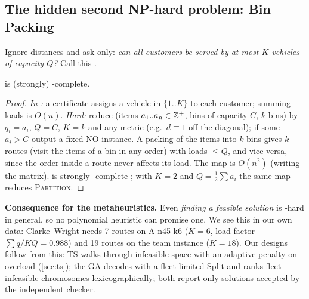 \subsection{The hidden second NP-hard problem: Bin Packing}
Ignore distances and ask only: \emph{can all customers be served by at most $K$ vehicles of capacity
$Q$?} Call this \feas.
\begin{theorem}\label{thm:bp}
\feas{} is (strongly) \NP-complete.
\end{theorem}
\begin{proof}
\emph{In \NP:} a certificate assigns a vehicle in $\{1..K\}$ to each customer; summing loads is $O(n)$.
\emph{Hard:} reduce \bp{} (items $a_1..a_n\in\mathbb{Z}^+$, bins of capacity $C$, $k$ bins) by
$q_i=a_i$, $Q=C$, $K=k$ and any metric (e.g.\ $d\equiv1$ off the diagonal); if some $a_i>C$ output a fixed
NO instance. A packing of the items into $k$ bins gives $k$ routes (visit the items of a bin in any order)
with loads $\le Q$, and vice versa, since the order inside a route never affects its load. The map is
$O(n^2)$ (writing the matrix). \bp{} is strongly \NP-complete \citep[SR1]{garey1979computers}; with
$K=2$ and $Q=\tfrac12\sum a_i$ the same map reduces \textsc{Partition}.
\end{proof}
\begin{keybox}
\textbf{Consequence for the metaheuristics.} Even \emph{finding a feasible solution} is \NP-hard in
general, so no polynomial heuristic can promise one. We see this in our own data: Clarke--Wright
needs 7 routes on A-n45-k6 ($K=6$, load factor $\sum q/KQ=0.988$) and 19 routes on the team instance
($K=18$). Our designs follow from this: TS walks through infeasible space with an adaptive penalty
on overload (\cref{sec:ts}); the GA decodes with a fleet-limited Split and ranks fleet-infeasible
chromosomes lexicographically; both report only solutions accepted by the independent checker.
\end{keybox}

